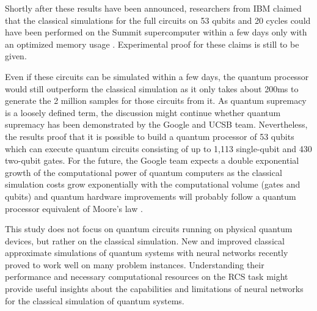 Shortly after these results have been announced, researchers from IBM claimed that the classical simulations
for the full circuits on 53 qubits and 20 cycles could have been performed
on the Summit supercomputer within a few days only with an optimized memory
usage \cite{pednault2019leveraging}. Experimental proof for these claims is still to be given.

Even if these circuits can be simulated within a few days, the quantum
processor would still outperform the classical simulation as it only
takes about 200ms to generate the 2 million samples for those circuits from it. As quantum
supremacy is a loosely defined term, the discussion might continue whether
quantum supremacy has been demonstrated by the Google and UCSB team. Nevertheless, 
the results proof that it is possible to build a quantum processor of 53 qubits
which can execute quantum circuits consisting of up to 1,113 single-qubit and
430 two-qubit gates. For the future, the Google team expects a double exponential growth of the computational
power of quantum computers as the classical simulation costs grow exponentially
with the computational volume (gates and qubits) and quantum hardware
improvements will probably follow a quantum processor equivalent of Moore's law \cite{martines2019supremacy}.

This study does not focus on quantum circuits running on physical quantum devices,
but rather on the classical simulation. New and improved classical
approximate simulations of quantum systems with neural networks recently proved
to work well on many problem instances. 
Understanding their performance and necessary computational resources on
the RCS task might provide useful insights about the capabilities and
limitations of neural networks for the classical simulation of quantum systems.